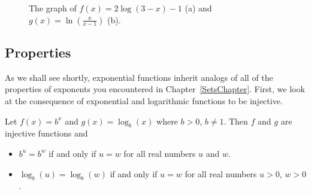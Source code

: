 \begin{example}
\begin{enumerate}
\end{enumerate}
\begin{figure}[H]
\centering
\centerline{
\hspace{1cm}
}	
\caption{The graph of $f(x) = 2\log(3-x)-1$ (a) and $g(x) = \ln \left(\frac{x}{x-1}\right)$ (b).}

\end{figure}


\end{example}
\fi


\subsection{Properties}
 As we shall see shortly, exponential functions inherit analogs of all of the properties of exponents you encountered in Chapter~\ref{SetsChapter}. First, we look at the consequence of  exponential and logarithmic functions to be injective.

Let $f(x) = b^{x}$ and $g(x) = \log_{b}(x)$ where $b>0$, $b\neq 1$.  Then $f$ and $g$ are injective functions and  
\begin{itemize}

\item  $b^{u} = b^{w}$ if and only if $u=w$ for all real numbers $u$ and $w$.

\item  $\log_{b}(u) = \log_{b}(w)$ if and only if $u=w$ for all real numbers $u > 0$, $w > 0$.

\end{itemize}

